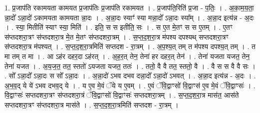 \documentclass[17pt]{extarticle}
\begin{document}
1. प्र॒जाप॑ति रकामयता कामयत प्र॒जाप॑तिः प्र॒जाप॑ति रकामयत । . प्र॒जाप॑ति॒रिति॑ प्र॒जा - प॒तिः॒ । . अ॒का॒म॒य॒ता॒ न्ना॒दो᳚ ऽन्ना॒दो॑ ऽकामयता कामयता न्ना॒दः । . अ॒न्ना॒दः स्याꣳ॑ स्या मन्ना॒दो᳚ ऽन्ना॒दः स्या᳚म् । . अ॒न्ना॒द इत्य॑न्न - अ॒दः । . स्या॒ मितीति॑ स्याꣳ स्या॒ मिति॑ । . इति॒ स स इतीति॒ सः । . स ए॒त मे॒तꣳ स स ए॒तम् । . ए॒तꣳ स॑प्तदशरा॒त्रꣳ स॑प्तदशरा॒त्र मे॒त मे॒तꣳ स॑प्तदशरा॒त्रम् । . स॒प्त॒द॒श॒रा॒त्र म॑पश्य दपश्यथ् सप्तदशरा॒त्रꣳ स॑प्तदशरा॒त्र म॑पश्यत् । . स॒प्त॒द॒श॒रा॒त्रमिति॑ सप्तदश - रा॒त्रम् । . अ॒प॒श्य॒त् तम् त म॑पश्य दपश्य॒त् तम् । . त मा तम् त मा । . आ ऽह॑र दहर॒दा ऽह॑रत् । . अ॒ह॒र॒त् तेन॒ तेना॑ हर दहर॒त् तेन॑ । . तेना॑ यजता यजत॒ तेन॒ तेना॑ यजत । . अ॒य॒ज॒त॒ तत॒ स्ततो॑ ऽयजता यजत॒ ततः॑ । . ततो॒ वै वै तत॒ स्ततो॒ वै । . वै स स वै वै सः । . सो᳚ ऽन्ना॒दो᳚ ऽन्ना॒दः स सो᳚ ऽन्ना॒दः । . अ॒न्ना॒दो॑ ऽभव दभव दन्ना॒दो᳚ ऽन्ना॒दो॑ ऽभवत् । . अ॒न्ना॒द इत्य॑न्न - अ॒दः । . अ॒भ॒व॒द् ये ये॑ ऽभव दभव॒द् ये । . य ए॒व मे॒वं ॅये य ए॒वम् । . ए॒वं ॅवि॒द्वाꣳसो॑ वि॒द्वाꣳस॑ ए॒व मे॒वं ॅवि॒द्वाꣳसः॑ । . वि॒द्वाꣳसः॑ सप्तदशरा॒त्रꣳ स॑प्तदशरा॒त्रं ॅवि॒द्वाꣳसो॑ वि॒द्वाꣳसः॑ सप्तदशरा॒त्रम् । . स॒प्त॒द॒श॒रा॒त्र मास॑त॒ आस॑ते सप्तदशरा॒त्रꣳ स॑प्तदशरा॒त्र मास॑ते । . स॒प्त॒द॒श॒रा॒त्रमिति॑ सप्तदश - रा॒त्रम् । \newline
\end{document}
